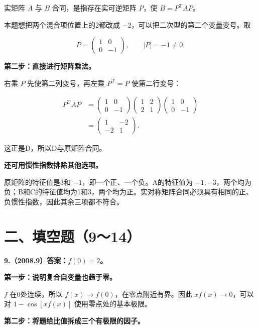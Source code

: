 \documentclass[UTF8,11pt,fontset=windows]{ctexart}
\begin{document}
实矩阵 $A$ 与 $B$ 合同，是指存在实可逆矩阵 $P$，使 $B=P^{\mathrm T}AP$。

本题想把两个混合项位置上的2都改成 $-2$，可以把二次型的第二个变量变号。取

$$
P=\begin{pmatrix}1&0\\0&-1\end{pmatrix},\qquad |P|=-1\ne0.
$$

\textbf{第二步：直接进行矩阵乘法。}

右乘 $P$ 先使第二列变号，再左乘 $P^{\mathrm T}=P$ 使第二行变号：

$$
\begin{aligned}
P^{\mathrm T}AP
&=\begin{pmatrix}1&0\\0&-1\end{pmatrix}
\begin{pmatrix}1&2\\2&1\end{pmatrix}
\begin{pmatrix}1&0\\0&-1\end{pmatrix}\\
&=\begin{pmatrix}1&-2\\-2&1\end{pmatrix}.
\end{aligned}
$$

这正是D，所以D与原矩阵合同。

\textbf{还可用惯性指数排除其他选项。}

原矩阵的特征值是3和 $-1$，即一个正、一个负。A的特征值为 $-1,-3$，两个均为负；B和C的特征值均为1和3，两个均为正。实对称矩阵合同必须具有相同的正、负惯性指数，因此其余三项都不符合。

\clearpage

\section*{二、填空题（9～14）}

\textbf{9.（2008.9）答案：$f(0)=2$。}

\textbf{第一步：说明复合自变量也趋于零。}

$f$ 在0处连续，所以 $f(x)\to f(0)$，在零点附近有界。因此 $xf(x)\to0$，可以对 $1-\cos[xf(x)]$ 使用零点处的基本极限。

\textbf{第二步：将题给比值拆成三个有极限的因子。}
\end{document}
